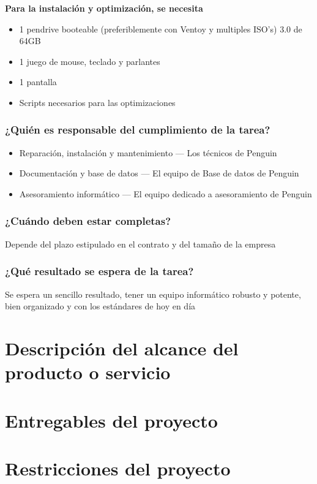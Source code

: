 \documentclass{article}
\begin{document}
			\textbf{Para la instalación y optimización, se necesita}
			\begin{itemize}
			\item 1 pendrive booteable (preferiblemente con Ventoy y multiples ISO's) 3.0 de 64GB
			\item 1 juego de mouse, teclado y parlantes 
			\item 1 pantalla
			\item Scripts necesarios para las optimizaciones
			\end{itemize}
			
		\subsubsection{¿Quién es responsable del cumplimiento de la tarea?}
			\begin{itemize}
			\item Reparación, instalación y mantenimiento --- Los técnicos de Penguin
			\item Documentación y base de datos --- El equipo de Base de datos de Penguin
			\item Asesoramiento informático --- El equipo dedicado a asesoramiento de Penguin
			\end{itemize}
			
		\subsubsection{¿Cuándo deben estar completas?}
			Depende del plazo estipulado en el contrato y del tamaño de la empresa
			
		\subsubsection{¿Qué resultado se espera de la tarea?}
			Se espera un sencillo resultado, tener un equipo informático robusto y potente, bien
			organizado y con los estándares de hoy en día
			
\section{Descripción del alcance del producto o servicio}

\section{Entregables del proyecto}

\section{Restricciones del proyecto}
\end{document}
